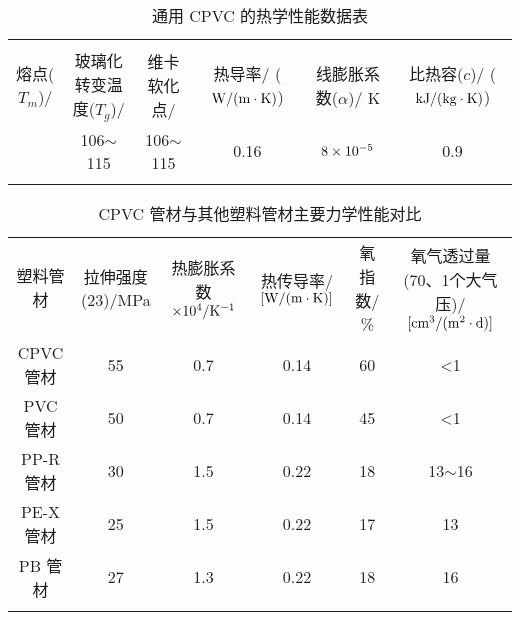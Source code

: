 \begin{table}[!htb]
	\caption{通用 CPVC 的热学性能数据表}
	\label{tabCPVCTher}
	\begin{center}
	\footnotesize{
		\begin{tabular}{cccccc}
			\borderLine
			\multicolumn{6}{c}{热学参数}    \\
			\borderLine
			\mc{熔点($T_m$)/\\\cd} & \mc{玻璃化转变温度($T_g$)/\\\cd} & \mc{维卡软化点/\\\cd} & \mc{热导率/\\($\rm{W/(m\cdot K)}$)} & \mc{线膨胀系数($\alpha$)/\\K} & \mc{比热容($c$)/\\($\rm{kJ/(kg\cdot K)}$)} \\
			\interLine
			150 & 106$\sim$115 & 106$\sim$115 & 0.16 & $\rm{8 \times 10^{-5}}$ & 0.9    \\
			\borderLine
		\end{tabular}
	}
	\end{center}
\end{table}

\begin{table}[!htb]
	\caption{CPVC 管材与其他塑料管材主要力学性能对比\cite{9}}
	\label{tabCompare}
	\begin{center}
	\footnotesize{
		\begin{tabular}{cccccc}
			\borderLine
			塑料管材 & \mc{拉伸强度 \\ (23\cd)/MPa} & \mc{热膨胀系数 \\ $\rm{\times 10^4/K^{-1}}$} & \mc{热传导率/ \\ $[\rm{W/(m\cdot K)}]$} & \mc{氧指数/ \\ \%} & \mc{氧气透过量(70\cd、1个大气压)/ \\ $[\rm{cm^3/(m^2\cdot d)}]$}  \\
			\interLine
			CPVC 管材 & 55 & 0.7 & 0.14 & 60 & <1 \\
			PVC 管材 & 50 & 0.7 & 0.14 & 45 & <1  \\
			PP-R 管材 & 30 & 1.5 & 0.22 & 18 & 13$\sim$16 \\
			PE-X 管材 & 25 & 1.5 & 0.22 & 17 & 13 \\
			PB 管材 & 27 & 1.3 & 0.22 & 18 & 16   \\
			\borderLine
		\end{tabular}
	}
	\end{center}
\end{table}

